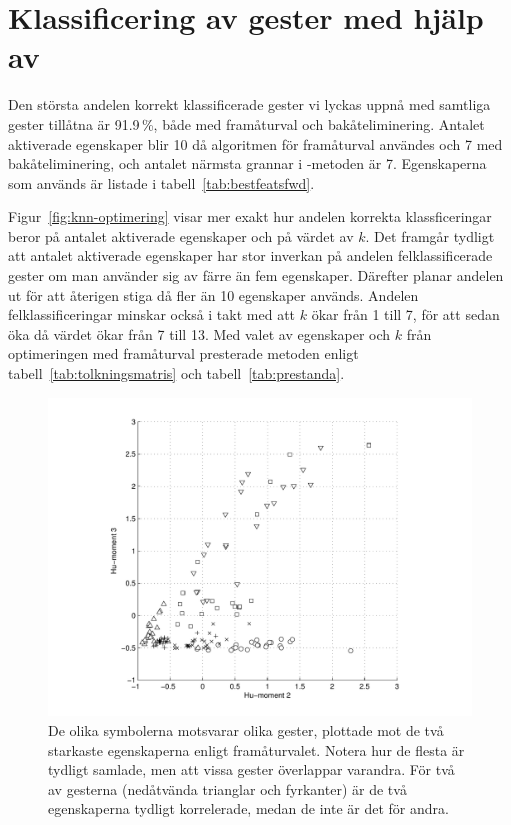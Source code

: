 \documentclass[../rapport_MVEX01-11-05]{subfiles}
\begin{document}
\section{Klassificering av gester med hjälp av \knn}
Den största andelen korrekt klassificerade gester vi lyckas uppnå
med samtliga gester tillåtna är 91.9\,\%, både med framåturval
och bakåteliminering. Antalet aktiverade
egenskaper blir 10 då algoritmen för framåturval användes och 7 med
bakåteliminering, och antalet närmsta grannar i \knn-metoden är 7. Egenskaperna som
används är listade i
tabell~\vref{tab:bestfeatsfwd}.

Figur~\vref{fig:knn-optimering} visar mer
exakt hur andelen korrekta
klassficeringar beror på antalet aktiverade egenskaper och på värdet av $k$.
Det framgår tydligt att antalet aktiverade egenskaper har stor
inverkan på andelen felklassificerade gester
om man använder sig av färre än
fem egenskaper. Därefter planar andelen ut för att återigen stiga då
fler än 10 egenskaper används. Andelen felklassificeringar
minskar också i takt med att $k$ ökar från 1 till 7, för att sedan
öka då värdet ökar från 7 till 13. Med valet av egenskaper och $k$ från
optimeringen med framåturval presterade metoden enligt
tabell~\vref{tab:tolkningsmatris} och tabell~\vref{tab:prestanda}.

\begin{figure}[tbp]
  \centering
  \includegraphics[width=\textwidth,trim=2cm 0.5cm 2cm 0,clip=true]{bilder/feats-10+11}
  \caption{De olika symbolerna motsvarar olika gester, plottade mot de två starkaste egenskaperna
  enligt framåturvalet. Notera hur de flesta är tydligt samlade, men att
	vissa gester överlappar varandra. För två av gesterna (nedåtvända trianglar och fyrkanter) 
	är de två egenskaperna tydligt korrelerade, medan de inte är det för andra.}
  \label{fig:feats1011}
\end{figure}
\end{document}
